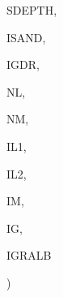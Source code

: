 {\begin{DoxyParamCaption}
\item[{real, dimension(nl,nm)}]{S\+D\+E\+P\+T\+H, }
\item[{integer, dimension (nl,nm,ig)}]{I\+S\+A\+N\+D, }
\item[{integer, dimension  (nl,nm)}]{I\+G\+D\+R, }
\item[{integer}]{N\+L, }
\item[{integer}]{N\+M, }
\item[{integer}]{I\+L1, }
\item[{integer}]{I\+L2, }
\item[{integer}]{I\+M, }
\item[{integer}]{I\+G, }
\item[{integer}]{I\+G\+R\+A\+L\+B}
\end{DoxyParamCaption}
)}\label{CLASSB_8f_ad124fb79b047c72316aea3d64d4721ee}

